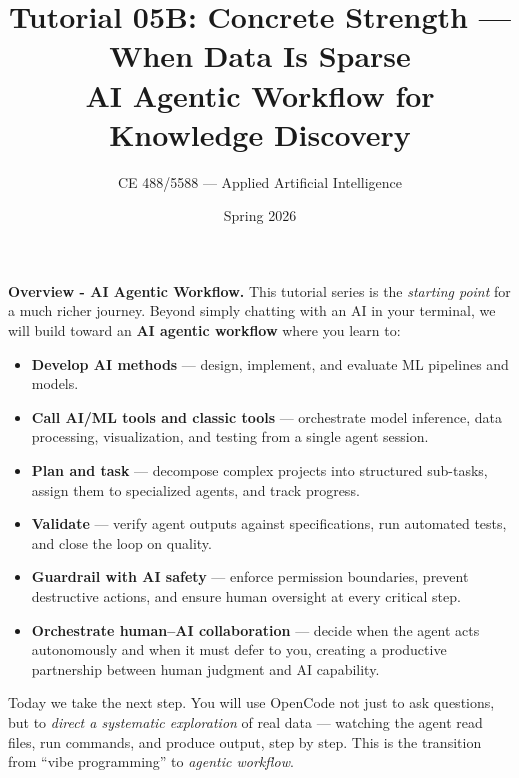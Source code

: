 \documentclass[11pt]{article}
\title{\textbf{Tutorial 05B: Concrete Strength --- When Data Is Sparse}\\[4pt]
       {\large AI Agentic Workflow for Knowledge Discovery}}
\author{CE 488/5588 --- Applied Artificial Intelligence}
\date{Spring 2026}
\begin{document}
\maketitle

\begin{def-box}
\textbf{Overview - AI Agentic Workflow.}
This tutorial series is the \emph{starting point} for a much richer journey.
Beyond simply chatting with an AI in your terminal, we will build toward an
\textbf{AI agentic workflow} where you learn to:
\begin{itemize}[nosep]
  \item \textbf{Develop AI methods} --- design, implement, and evaluate ML pipelines and models.
  \item \textbf{Call AI/ML tools and classic tools} --- orchestrate model inference, data processing, visualization, and testing from a single agent session.
  \item \textbf{Plan and task} --- decompose complex projects into structured sub-tasks, assign them to specialized agents, and track progress.
  \item \textbf{Validate} --- verify agent outputs against specifications, run automated tests, and close the loop on quality.
  \item \textbf{Guardrail with AI safety} --- enforce permission boundaries, prevent destructive actions, and ensure human oversight at every critical step.
  \item \textbf{Orchestrate human--AI collaboration} --- decide when the agent acts autonomously and when it must defer to you, creating a productive partnership between human judgment and AI capability.
\end{itemize}
Today we take the next step.  You will use OpenCode not just to ask questions, but to \emph{direct a systematic exploration} of real data --- watching the agent read files, run commands, and produce output, step by step.  This is the transition from ``vibe programming'' to \emph{agentic workflow}.
\end{def-box}
\end{document}
